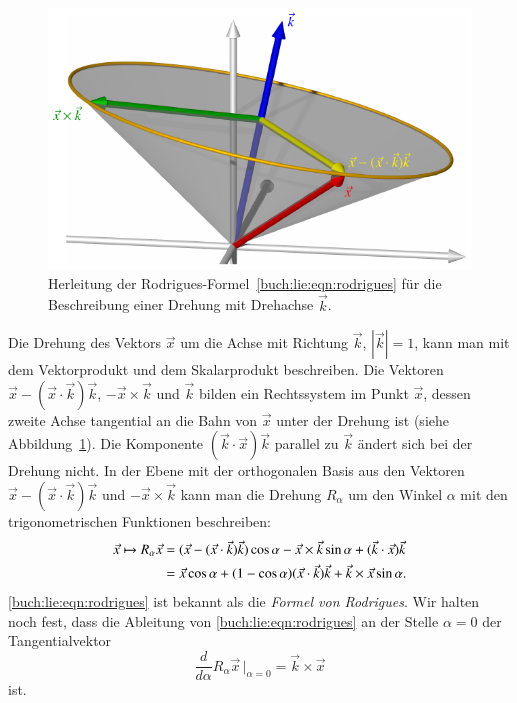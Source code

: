 \begin{figure}
\centering
\includegraphics{chapters/60-gruppen/images/rodriguez.pdf}
\caption{Herleitung der Rodrigues-Formel~\eqref{buch:lie:eqn:rodrigues}
für die Beschreibung einer
Drehung mit Drehachse $\vec{k}$.
\label{buch:lie:fig:rodrigues}}
\end{figure}
Die Drehung des Vektors $\vec{x}$ um die Achse mit Richtung $\vec{k}$,
$|\vec{k}|=1$, kann man mit dem Vektorprodukt und dem Skalarprodukt
beschreiben.
Die Vektoren $\vec{x}-(\vec{x}\cdot\vec{k})\vec{k}$, $-\vec{x}\times\vec{k}$
und $\vec{k}$ bilden ein Rechtssystem im Punkt $\vec{x}$, dessen zweite
Achse tangential an die Bahn von $\vec{x}$ unter der Drehung ist
(siehe Abbildung~\ref{buch:lie:fig:rodrigues}).
%
Die Komponente $(\vec{k}\cdot\vec{x})\vec{k}$ parallel zu $\vec{k}$
ändert sich bei der Drehung nicht.
In der Ebene mit der orthogonalen Basis aus den Vektoren
$\vec{x}-(\vec{x}\cdot\vec{k})\vec{k}$ und $-\vec{x}\times\vec{k}$
kann man die Drehung $R_\alpha$ um den Winkel $\alpha$ mit den
trigonometrischen Funktionen beschreiben:
\begin{align}
\vec{x}
\mapsto
R_\alpha\vec{x}
&=
(\vec{x}-(\vec{x}\cdot\vec{k})\vec{k})
\cos\alpha
-
\vec{x}\times\vec{k}
\sin\alpha
+
(\vec{k}\cdot\vec{x})\vec{k}
\notag
\\
&=
\vec{x}\cos\alpha
+
(1-\cos\alpha)(\vec{x}\cdot\vec{k})\vec{k}
+
\vec{k}\times\vec{x}\sin\alpha.
\label{buch:lie:eqn:rodrigues}
\end{align}
\eqref{buch:lie:eqn:rodrigues} 
ist bekannt als die {\em Formel von Rodrigues}.
%
%
Wir halten noch fest, dass die Ableitung
von \eqref{buch:lie:eqn:rodrigues} 
an der Stelle $\alpha=0$
der Tangentialvektor
\begin{equation}
\frac{d}{d\alpha}R_\alpha\vec{x}\,\bigg|_{\alpha=0}
=
\vec{k}\times\vec{x}
\label{buch:lie:eqn:so3tangentialvektor}
\end{equation}
ist.

